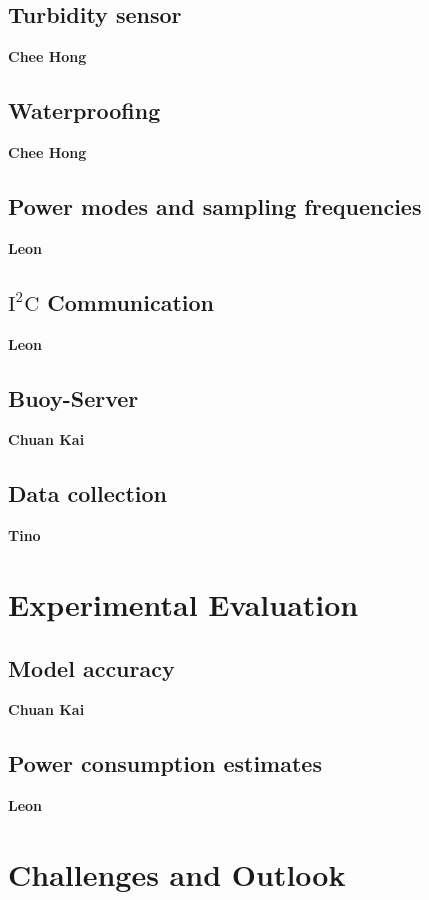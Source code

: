 \documentclass{article}
\begin{document}
\subsection{Turbidity sensor}

\textbf{Chee Hong}

\subsection{Waterproofing}

\textbf{Chee Hong}

\subsection{Power modes and sampling frequencies}

\textbf{Leon}

\subsection{$\text{I}^2\text{C}$ Communication}

\textbf{Leon}

\subsection{Buoy-Server}

\textbf{Chuan Kai}

\subsection{Data collection}

\textbf{Tino}

\section{Experimental Evaluation}

\subsection{Model accuracy}

\textbf{Chuan Kai}

\subsection{Power consumption estimates}

\textbf{Leon}

\section{Challenges and Outlook}
\end{document}
